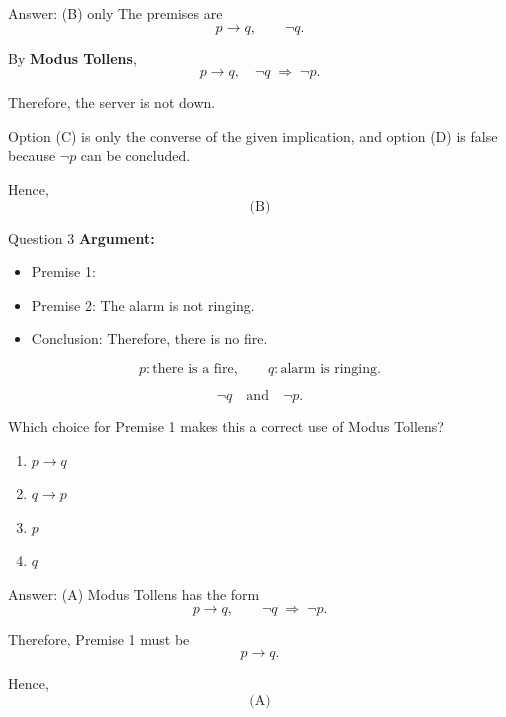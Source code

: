 \documentclass[aspectratio=169,11pt]{beamer}
\begin{document}
\begin{frame}
\begin{block}{Answer: (B) only}
The premises are
$$
p\to q,\qquad \neg q.
$$

By \textbf{Modus Tollens},
$$
p\to q,\quad \neg q
\;\Rightarrow\;
\neg p.
$$

Therefore, the server is not down.

Option (C) is only the converse of the given implication, and
option (D) is false because $\neg p$ can be concluded.

Hence,
$$
\boxed{\text{(B)}}
$$
\end{block}
\end{frame}
\begin{frame}{Question 3}
\textbf{Argument:}

\begin{itemize}
    \item Premise 1: \hspace{1cm}
    \item Premise 2: The alarm is not ringing.
    \item Conclusion: Therefore, there is no fire.
\end{itemize}


$$
p:\text{there is a fire},\qquad q:\text{alarm is ringing}.
$$

$$
\neg q \quad\text{and}\quad \neg p.
$$

Which choice for Premise 1 makes this a correct use of Modus Tollens?

\begin{enumerate}
    \item[(A)] $p\to q$
    \item[(B)] $q\to p$
    \item[(C)] $p$
    \item[(D)] $q$
\end{enumerate}
\end{frame}

\begin{frame}
\begin{block}{Answer: (A)}
Modus Tollens has the form
$$
p\to q,\qquad \neg q
\;\Rightarrow\;
\neg p.
$$

Therefore, Premise 1 must be
$$
p\to q.
$$

Hence,
$$
\boxed{\text{(A)}}
$$
\end{block}
\end{frame}
\end{document}

